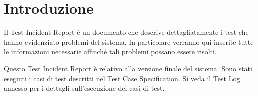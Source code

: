 \chapter{Introduzione}
Il Test Incident Report è un documento che descrive dettagliatamente i test che hanno evidenziato problemi del sistema. In particolare verranno qui inserite tutte le informazioni necessarie affinché tali problemi possano essere risolti.

Questo Test Incident Report è relativo alla versione finale del sistema. Sono stati eseguiti i casi di test descritti nel Test Case Specification. Si veda il Test Log annesso per i dettagli sull'esecuzione dei casi di test.